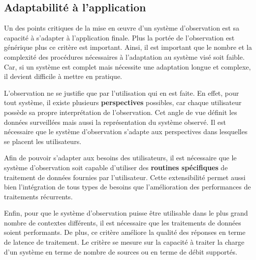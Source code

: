 \subsection{Adaptabilité à l'application}
Un des points critiques de la mise en œuvre d'un système d'observation est sa capacité à s'adapter à l'application finale. Plus la portée de l'observation est générique plus ce critère est important. Ainsi, il est important que le nombre et la complexité des procédures nécessaires à l'adaptation au système visé soit faible. Car, si un système est complet mais nécessite une adaptation longue et complexe, il devient difficile à mettre en pratique.

L'observation ne se justifie que par l'utilisation qui en est faite. En effet, pour tout système, il existe plusieurs \textbf{perspectives} possibles, car chaque utilisateur possède sa propre interprétation de l'observation. Cet angle de vue définit les données surveillées mais aussi la représentation du système observé. Il est nécessaire que le système d'observation s'adapte aux perspectives dans lesquelles se placent les utilisateurs.

Afin de pouvoir s'adapter aux besoins des utilisateurs, il est nécessaire que le système d'observation soit capable d'utiliser des \textbf{routines spécifiques} de traitement de données fournies par l'utilisateur. Cette extensibilité permet aussi bien l'intégration de tous types de besoins que l'amélioration des performances de traitements récurrents.

Enfin, pour que le système d'observation puisse être utilisable dans le plus grand nombre de contextes différents, il est nécessaire que les traitements de données soient performants. De plus, ce critère améliore la qualité des réponses en terme de latence de traitement. Le critère se mesure sur la capacité à traiter la charge d'un système en terme de nombre de sources ou en terme de débit supportés.

